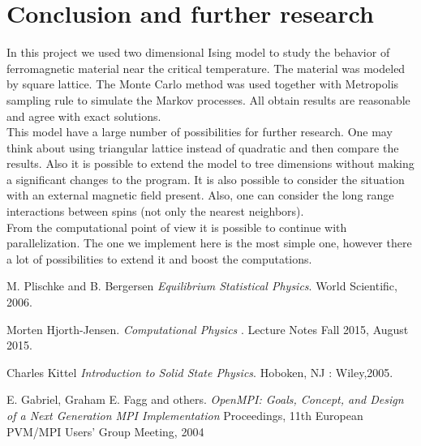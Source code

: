 \documentclass[a4paper]{article}
\begin{document}
\section{Conclusion and further research}\label{Conclusion}
In this project we used two dimensional Ising model to study the behavior of ferromagnetic material near the critical temperature. The material was modeled by square lattice. The Monte Carlo method was used together with Metropolis sampling rule to simulate the Markov processes. All obtain results are reasonable and agree with exact solutions.\\ 
This model have a large number of possibilities for further research. One may think about using triangular lattice instead of quadratic and then compare the results. Also it is possible to extend the model to tree dimensions without making a significant changes to the program. It is also possible to consider the situation with an external magnetic field present. Also, one can consider the long range interactions between spins (not only the nearest neighbors).\\
From the computational point of view it is possible to continue with parallelization. The one we implement here is the most simple one, however there a lot of possibilities to extend it and boost the computations.
\clearpage
\newpage
\begin{thebibliography}{one}

M. Plischke and B. Bergersen
\textit{Equilibrium Statistical Physics}. 
World Scientific, 2006.

Morten Hjorth-Jensen. 
\textit{Computational Physics
}. 
Lecture Notes Fall 2015, August 2015.



Charles Kittel
\textit{Introduction to Solid State Physics}. 
 Hoboken, NJ : Wiley,2005.

E. Gabriel,  Graham E. Fagg and others.
\textit{OpenMPI: Goals, Concept, and Design of a Next Generation MPI Implementation}
Proceedings, 11th European PVM/MPI Users' Group Meeting, 2004


  
\end{thebibliography}
\end{document}
